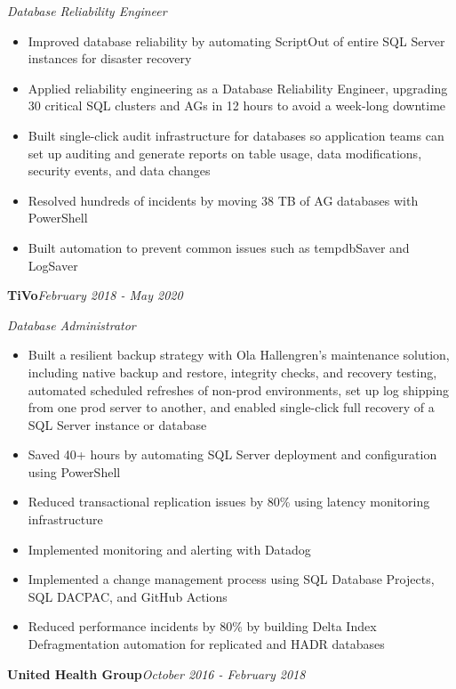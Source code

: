 \documentclass[10pt,a4paper]{article}
\begin{document}
\textit{Database Reliability Engineer}\\[-5pt]
\begin{itemize}
  \item Improved database reliability by automating ScriptOut of entire SQL Server instances for disaster recovery
  \item Applied reliability engineering as a Database Reliability Engineer, upgrading 30 critical SQL clusters and AGs in 12 hours to avoid a week-long downtime
  \item Built single-click audit infrastructure for databases so application teams can set up auditing and generate reports on table usage, data modifications, security events, and data changes
  \item Resolved hundreds of incidents by moving 38 TB of AG databases with PowerShell
  \item Built automation to prevent common issues such as tempdbSaver and LogSaver
\end{itemize}
\vspace{14.7pt}
\noindent\textbf{TiVo}\hfill \textit{February 2018 - May 2020}

\textit{Database Administrator}\\[-5pt]
\begin{itemize}
  \item Built a resilient backup strategy with Ola Hallengren's maintenance solution, including native backup and restore, integrity checks, and recovery testing, automated scheduled refreshes of non-prod environments, set up log shipping from one prod server to another, and enabled single-click full recovery of a SQL Server instance or database
  \item Saved 40+ hours by automating SQL Server deployment and configuration using PowerShell
  \item Reduced transactional replication issues by 80\% using latency monitoring infrastructure
  \item Implemented monitoring and alerting with Datadog
  \item Implemented a change management process using SQL Database Projects, SQL DACPAC, and GitHub Actions
  \item Reduced performance incidents by 80\% by building Delta Index Defragmentation automation for replicated and HADR databases
\end{itemize}
\vspace{14.7pt}
\noindent\textbf{United Health Group}\hfill \textit{October 2016 - February 2018}
\end{document}
